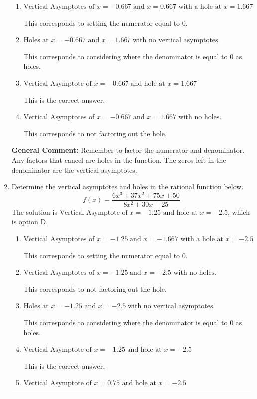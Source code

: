 \documentclass{extbook}[14pt]
\newcommand{\litem}[1]{\item #1

\rule{\textwidth}{0.4pt}}
\begin{document}
\begin{enumerate}
{\begin{enumerate}[label=\Alph*.]
This corresponds to mixing vertical and horizontal asymptotes.
\item \( \text{Vertical Asymptotes of } x = -0.667 \text{ and } x = 0.667 \text{ with a hole at } x = 1.667 \)

This corresponds to setting the numerator equal to 0.
\item \( \text{Holes at } x = -0.667 \text{ and } x = 1.667 \text{ with no vertical asymptotes.} \)

This corresponds to considering where the denominator is equal to 0 as holes.
\item \( \text{Vertical Asymptote of } x = -0.667 \text{ and hole at } x = 1.667 \)

This is the correct answer.
\item \( \text{Vertical Asymptotes of } x = -0.667 \text{ and } x = 1.667 \text{ with no holes.} \)

This corresponds to not factoring out the hole.
\end{enumerate}

\textbf{General Comment:} Remember to factor the numerator and denominator. Any factors that cancel are holes in the function. The zeros left in the denominator are the vertical asymptotes.
}
\litem{
Determine the vertical asymptotes and holes in the rational function below.
\[ f(x) = \frac{6x^{3} +37 x^{2} +75 x + 50}{8x^{2} +30 x + 25} \]The solution is \( \text{Vertical Asymptote of } x = -1.25 \text{ and hole at } x = -2.5 \), which is option D.\begin{enumerate}[label=\Alph*.]
\item \( \text{Vertical Asymptotes of } x = -1.25 \text{ and } x = -1.667 \text{ with a hole at } x = -2.5 \)

This corresponds to setting the numerator equal to 0.
\item \( \text{Vertical Asymptotes of } x = -1.25 \text{ and } x = -2.5 \text{ with no holes.} \)

This corresponds to not factoring out the hole.
\item \( \text{Holes at } x = -1.25 \text{ and } x = -2.5 \text{ with no vertical asymptotes.} \)

This corresponds to considering where the denominator is equal to 0 as holes.
\item \( \text{Vertical Asymptote of } x = -1.25 \text{ and hole at } x = -2.5 \)

This is the correct answer.
\item \( \text{Vertical Asymptote of } x = 0.75 \text{ and hole at } x = -2.5 \)


\end{enumerate}}
\end{enumerate}
\end{document}
